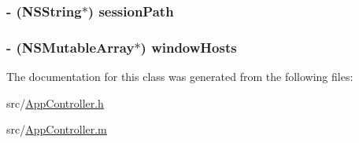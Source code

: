 \hypertarget{interface_app_controller_a2bc77f00fb3042642694252f4cb00da5}{
\subsubsection[{session\-Path}]{\setlength{\rightskip}{0pt plus 5cm}-\/ (N\-S\-String$\ast$) session\-Path\hspace{0.3cm}{\ttfamily [protected]}}}\label{interface_app_controller_a2bc77f00fb3042642694252f4cb00da5}
\hypertarget{interface_app_controller_a7c0f9ff6d61aace19ae403c73acbc518}{
\subsubsection[{window\-Hosts}]{\setlength{\rightskip}{0pt plus 5cm}-\/ (N\-S\-Mutable\-Array$\ast$) window\-Hosts\hspace{0.3cm}{\ttfamily [protected]}}}\label{interface_app_controller_a7c0f9ff6d61aace19ae403c73acbc518}


The documentation for this class was generated from the following files\-:\begin{DoxyCompactItemize}
\item 
src/\hyperlink{_app_controller_8h}{App\-Controller.\-h}\item 
src/\hyperlink{_app_controller_8m}{App\-Controller.\-m}\end{DoxyCompactItemize}
